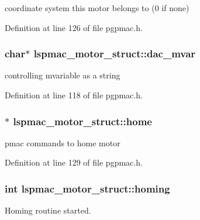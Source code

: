 coordinate system this motor belongs to (0 if none) 



Definition at line 126 of file pgpmac.\-h.

\hypertarget{structlspmac__motor__struct_a05dff021221abbc1bf656039fffb3275}{
\subsubsection[{dac\-\_\-mvar}]{\setlength{\rightskip}{0pt plus 5cm}char$\ast$ lspmac\-\_\-motor\-\_\-struct\-::dac\-\_\-mvar}}\label{structlspmac__motor__struct_a05dff021221abbc1bf656039fffb3275}


controlling mvariable as a string 



Definition at line 118 of file pgpmac.\-h.

\hypertarget{structlspmac__motor__struct_a6dc1ceab86687f741d4c4a574501959c}{
\subsubsection[{home}]{$\ast$ lspmac\-\_\-motor\-\_\-struct\-::home}}\label{structlspmac__motor__struct_a6dc1ceab86687f741d4c4a574501959c}


pmac commands to home motor 



Definition at line 129 of file pgpmac.\-h.

\hypertarget{structlspmac__motor__struct_aa74108855693f94fc2ff76333c9fb6ac}{
\subsubsection[{homing}]{\setlength{\rightskip}{0pt plus 5cm}int lspmac\-\_\-motor\-\_\-struct\-::homing}}\label{structlspmac__motor__struct_aa74108855693f94fc2ff76333c9fb6ac}


Homing routine started. 



